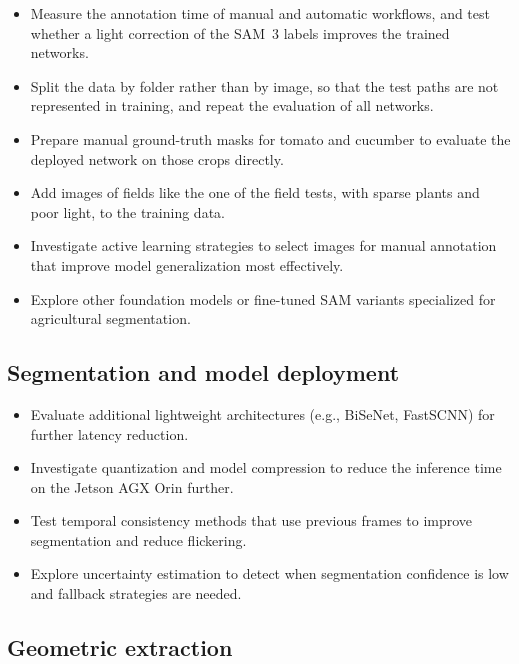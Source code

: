 \begin{itemize}
\item Measure the annotation time of manual and automatic workflows, and test whether a light correction of the SAM~3 labels improves the trained networks.
\item Split the data by folder rather than by image, so that the test paths are not represented in training, and repeat the evaluation of all networks.
\item Prepare manual ground-truth masks for tomato and cucumber to evaluate the deployed network on those crops directly.
\item Add images of fields like the one of the field tests, with sparse plants and poor light, to the training data.
\item Investigate active learning strategies to select images for manual annotation that improve model generalization most effectively.
\item Explore other foundation models or fine-tuned SAM variants specialized for agricultural segmentation.
\end{itemize}

\subsection{Segmentation and model deployment}
\label{subsec:future_segmentation}

\begin{itemize}
\item Evaluate additional lightweight architectures (e.g., BiSeNet, FastSCNN) for further latency reduction.
\item Investigate quantization and model compression to reduce the inference time on the Jetson AGX Orin further.
\item Test temporal consistency methods that use previous frames to improve segmentation and reduce flickering.
\item Explore uncertainty estimation to detect when segmentation confidence is low and fallback strategies are needed.
\end{itemize}

\subsection{Geometric extraction}
\label{subsec:future_geometric}

